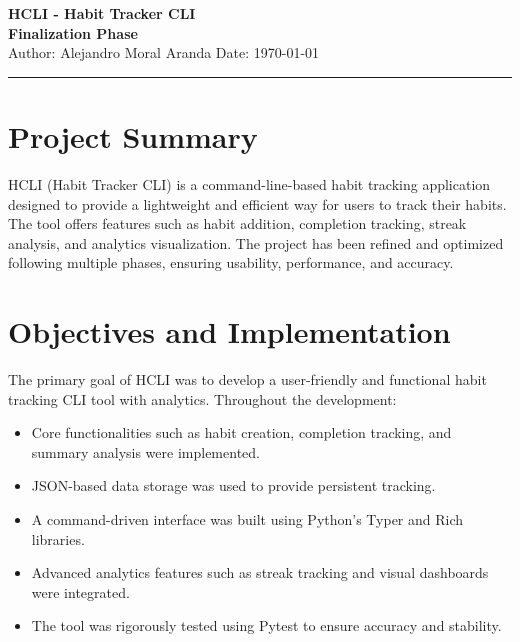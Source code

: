 \documentclass[a4paper,12pt]{article}
\begin{document}
\begin{center}
    {\LARGE \textbf{HCLI - Habit Tracker CLI}}\\[0.5cm]
    {\Large \textbf{Finalization Phase}}\\[0.3cm]
    {\small Author: Alejandro Moral Aranda \hspace{1cm} Date: \today}
    \hrule
\end{center}

\section{Project Summary}
HCLI (Habit Tracker CLI) is a command-line-based habit tracking application designed to provide a lightweight and efficient way for users to track their habits. The tool offers features such as habit addition, completion tracking, streak analysis, and analytics visualization. The project has been refined and optimized following multiple phases, ensuring usability, performance, and accuracy.

\section{Objectives and Implementation}
The primary goal of HCLI was to develop a user-friendly and functional habit tracking CLI tool with analytics. Throughout the development:
\begin{itemize}
    \item Core functionalities such as habit creation, completion tracking, and summary analysis were implemented.
    \item JSON-based data storage was used to provide persistent tracking.
    \item A command-driven interface was built using Python’s Typer and Rich libraries.
    \item Advanced analytics features such as streak tracking and visual dashboards were integrated.
    \item The tool was rigorously tested using Pytest to ensure accuracy and stability.
\end{itemize}

\end{document}

